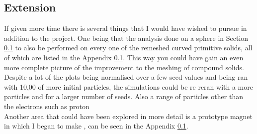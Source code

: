 \documentclass[12pt,a4paper]{article}
\begin{document}
\subsection{Extension}
If given more time there is several things that I  would have wished to pursue in addition to the project. One being that the analysis done on a sphere in Section \ref{} to also be performed on every one of the remeshed curved primitive solids, all of which are listed in the Appendix \ref{}. This way you could have gain an even more complete picture of the improvement to the meshing of compound solids. Despite a lot of the plots being normalised over a few seed values and being ran with 10,00 of more initial particles, the simulations could be re reran with a more particles and for a larger number of seeds. Also a range of particles other than the electrons such as proton\\
Another area that could have been explored in more detail is a prototype magnet in which I began to make , can be seen in the Appendix \ref{}.

\newpage
\newpage
\footnotesize
\end{document}
